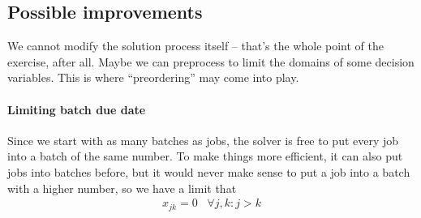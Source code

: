 \documentclass[13pt, letterpaper, twoside]{book}
\begin{document}
\subsection{Possible improvements}
We cannot modify the solution process itself -- that's the whole point of the exercise, after all. Maybe we can preprocess to limit the domains of some decision variables. This is where ``preordering'' may come into play.
\paragraph{Limiting batch due date}
Since we start with as many batches as jobs, the solver is free to put every job into a batch of the same number. To make things more efficient, it can also put jobs into batches before, but it would never make sense to put a job into a batch with a higher number, so we have a limit that
\begin{align}
  x_{jk} = 0 \;\;\; \forall j,k: j > k
\end{align}
\end{document}
